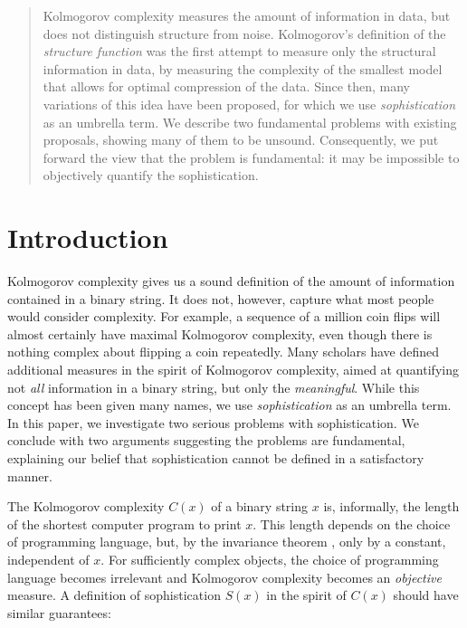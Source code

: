 
\begin{abstract}
Kolmogorov complexity measures the amount of information in data, but does not distinguish structure from noise. Kolmogorov's definition of the \emph{structure function} was the first attempt to measure only the structural information in data, by measuring the complexity of the smallest model that allows for optimal compression of the data. Since then, many variations of this idea have been proposed, for which we use \emph{sophistication} as an umbrella term. We describe two fundamental problems with existing proposals, showing many of them to be unsound. Consequently, we put forward the view that the problem is fundamental: it may be impossible to objectively quantify the sophistication.
\end{abstract}

\section{Introduction}\enlargethispage{3\baselineskip}

Kolmogorov complexity gives us a sound definition of the amount of information contained in a binary string. It does not, however, capture what most people would consider complexity. For example, a sequence of a million coin flips will almost certainly have maximal Kolmogorov complexity, even though there is nothing complex about flipping a coin repeatedly. Many scholars have defined additional measures in the spirit of Kolmogorov complexity, aimed at quantifying not \emph{all} information in a binary string, but only the \emph{meaningful}. While this concept has been given many names, we use \emph{sophistication} as an umbrella term. In this paper, we investigate two serious problems with sophistication. We conclude with two arguments suggesting the problems are fundamental, explaining our belief that sophistication cannot be defined in a satisfactory manner.

The Kolmogorov complexity $C(x)$ of a binary string $x$ is, informally, the length of the shortest computer program to print $x$. This length depends on the choice of programming language, but, by the invariance theorem \cite[Section~2.1]{li1993introduction}, only by a constant, independent of $x$. For sufficiently complex objects, the choice of programming language becomes irrelevant and Kolmogorov complexity becomes an \emph{objective} measure. A definition of sophistication $S(x)$ in the spirit of $C(x)$ should have similar guarantees:

